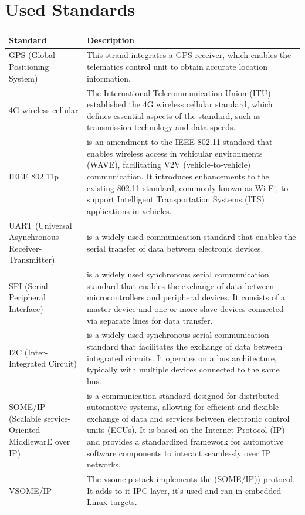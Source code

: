 \documentclass[
12pt,
oneside, 
onehalfspacing, 
nolistspacing, 
parskip, 
chapterinoneline, 
]{AASTCOMPUTER}
\begin{document}
\section{Used Standards}
\begin{tabular}{|p{5cm}|p{10cm}|}
  \hline
  \textbf{Standard} & \textbf{Description} \\
  \hline
  GPS (Global Positioning System) & This strand integrates a GPS receiver, which enables the telematics control unit to obtain accurate location information. \\
  \hline
  4G wireless cellular & The International Telecommunication Union (ITU) established the 4G wireless cellular standard, which defines essential aspects of the standard, such as transmission technology and data speeds. \\
  \hline
    IEEE 802.11p & is an amendment to the IEEE 802.11 standard that enables wireless access in vehicular environments (WAVE), facilitating V2V (vehicle-to-vehicle) communication. It introduces enhancements to the existing 802.11 standard, commonly known as Wi-Fi, to support Intelligent Transportation Systems (ITS) applications in vehicles. \\
  \hline
    UART (Universal Asynchronous Receiver-Transmitter) & is a widely used communication standard that enables the serial transfer of data between electronic devices. \\
  \hline
    SPI (Serial Peripheral Interface) & is a widely used synchronous serial communication standard that enables the exchange of data between microcontrollers and peripheral devices. It consists of a master device and one or more slave devices connected via separate lines for data transfer. \\
  \hline
    I2C (Inter-Integrated Circuit) &  is a widely used synchronous serial communication standard that facilitates the exchange of data between integrated circuits. It operates on a bus architecture, typically with multiple devices connected to the same bus. \\
  \hline
    SOME/IP (Scalable service-Oriented MiddlewarE over IP) & is a communication standard designed for distributed automotive systems, allowing for efficient and flexible exchange of data and services between electronic control units (ECUs). It is based on the Internet Protocol (IP) and provides a standardized framework for automotive software components to interact seamlessly over IP networks. \\
  \hline
    VSOME/IP & The vsomeip stack implements the (SOME/IP)) protocol. It adds to it IPC layer, it's used and ran in embedded Linux targets. \\
  \hline

\end{tabular}
\end{document}
